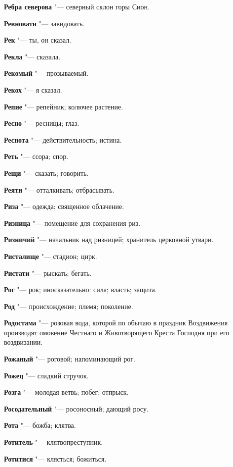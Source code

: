 \begin{mymulticols}
\noindent\textbf{Ребра северова} "--- северный склон горы Сион. 

\noindent\textbf{Ревновати} "--- завидовать. 

\noindent\textbf{Рек} "--- ты, он сказал. 

\noindent\textbf{Рекла} "--- сказала. 

\noindent\textbf{Рекомый} "--- прозываемый. 

\noindent\textbf{Рекох} "--- я сказал. 

\noindent\textbf{Репие} "--- репейник; колючее растение. 

\noindent\textbf{Ресно} "--- ресницы; глаз. 

\noindent\textbf{Реснота} "--- действительность; истина. 

\noindent\textbf{Реть} "--- ссора; спор. 

\noindent\textbf{Рещи} "--- сказать; говорить. 

\noindent\textbf{Реяти} "--- отталкивать; отбрасывать. 

\noindent\textbf{Риза} "--- одежда; священное облачение. 

\noindent\textbf{Ризница} "--- помещение для сохранения риз. 

\noindent\textbf{Ризничий} "--- начальник над ризницей; хранитель церковной утвари. 

\noindent\textbf{Ристалище} "--- стадион; цирк. 

\noindent\textbf{Ристати} "--- рыскать; бегать. 

\noindent\textbf{Рог} "--- рок; иносказательно: сила; власть; защита. 

\noindent\textbf{Род} "--- происхождение; племя; поколение. 

\noindent\textbf{Родостама} "--- розовая вода, которой по обычаю в праздник Воздвижения производят омовение Честнаго и Животворящего Креста Господня при его воздвизании. 

\noindent\textbf{Рожаный} "--- роговой; напоминающий рог. 

\noindent\textbf{Рожец} "--- сладкий стручок. 

\noindent\textbf{Розга} "--- молодая ветвь; побег; отпрыск. 

\noindent\textbf{Росодательный} "--- росоносный; дающий росу. 

\noindent\textbf{Рота} "--- божба; клятва. 

\noindent\textbf{Ротитель} "--- клятвопреступник. 

\noindent\textbf{Ротитися} "--- клясться; божиться. 


\end{mymulticols}
